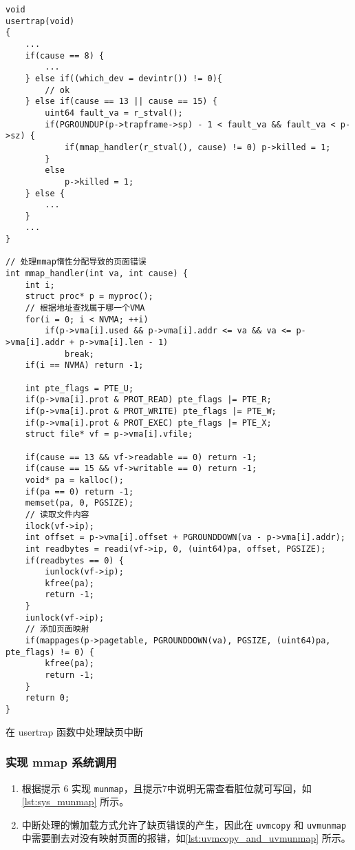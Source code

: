 \begin{listing}[!htb]
	\begin{verbatim}
void
usertrap(void)
{
    ...
    if(cause == 8) {
        ...
    } else if((which_dev = devintr()) != 0){
        // ok
    } else if(cause == 13 || cause == 15) {
        uint64 fault_va = r_stval();
        if(PGROUNDUP(p->trapframe->sp) - 1 < fault_va && fault_va < p->sz) {
            if(mmap_handler(r_stval(), cause) != 0) p->killed = 1;
        } 
        else
            p->killed = 1;
    } else {
        ...
    }
    ...
}

// 处理mmap惰性分配导致的页面错误
int mmap_handler(int va, int cause) {
    int i;
    struct proc* p = myproc();
    // 根据地址查找属于哪一个VMA
    for(i = 0; i < NVMA; ++i) 
        if(p->vma[i].used && p->vma[i].addr <= va && va <= p->vma[i].addr + p->vma[i].len - 1) 
            break;
    if(i == NVMA) return -1;
    
    int pte_flags = PTE_U;
    if(p->vma[i].prot & PROT_READ) pte_flags |= PTE_R;
    if(p->vma[i].prot & PROT_WRITE) pte_flags |= PTE_W;
    if(p->vma[i].prot & PROT_EXEC) pte_flags |= PTE_X;
    struct file* vf = p->vma[i].vfile;

    if(cause == 13 && vf->readable == 0) return -1;
    if(cause == 15 && vf->writable == 0) return -1;
    void* pa = kalloc();
    if(pa == 0) return -1;
    memset(pa, 0, PGSIZE);    
    // 读取文件内容
    ilock(vf->ip);
    int offset = p->vma[i].offset + PGROUNDDOWN(va - p->vma[i].addr);
    int readbytes = readi(vf->ip, 0, (uint64)pa, offset, PGSIZE);
    if(readbytes == 0) {
        iunlock(vf->ip);
        kfree(pa);
        return -1;
    }
    iunlock(vf->ip);
    // 添加页面映射
    if(mappages(p->pagetable, PGROUNDDOWN(va), PGSIZE, (uint64)pa, pte_flags) != 0) {
        kfree(pa);
        return -1;
    }
    return 0;
}
	\end{verbatim}
	\caption{在 usertrap 函数中处理缺页中断}\label{lst:mmap_usertrap}
\end{listing}

\subsubsection{实现 mmap 系统调用}

\begin{enumerate}
	\item 根据提示 6 实现 \texttt{munmap}，且提示7中说明无需查看脏位就可写回，如\cref{lst:sys_munmap} 所示。
	\item 中断处理的懒加载方式允许了缺页错误的产生，因此在 \texttt{uvmcopy} 和
	\texttt{uvmunmap} 中需要删去对没有映射页面的报错，如\cref{lst:uvmcopy_and_uvmunmap} 所示。
\end{enumerate}

